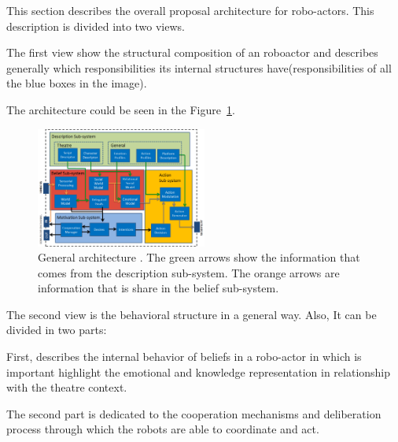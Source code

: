 This section describes the overall proposal architecture for robo-actors. This description is divided into two views. 

The first view show the structural composition of an roboactor and describes generally which responsibilities its internal structures have(responsibilities of all the blue boxes in the image).

The architecture could be seen in the Figure~\ref{fig:generalArchitecture}. 
\begin{figure}
	\centering
	\includegraphics[width=0.5\textwidth]{Images/GeneralArchitecture.png} 
	\caption{General architecture . The green arrows show the information that comes from the description sub-system. The orange arrows are information that is share in the belief sub-system.}
	\label{fig:generalArchitecture}
\end{figure}

The second view is the behavioral structure in a general way. Also, It can be divided in two parts:

First, describes the internal behavior of beliefs in a robo-actor in which is important highlight the emotional and knowledge representation in relationship with the theatre context.

The second part is dedicated to the cooperation mechanisms and deliberation process through which the robots are able to coordinate and act.